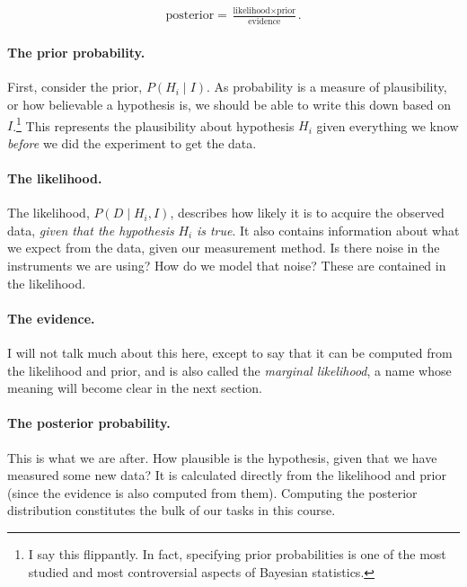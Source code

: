 \begin{align}
\text{posterior} = \frac{\text{likelihood} \times \text{prior}}{\text{evidence}}.
\end{align}

\paragraph{The prior probability.}  First, consider the prior,
$P(H_i \mid I)$.  As probability is a measure of plausibility, or how
believable a hypothesis is, we should be able to write this down based
on $I$.\footnote{I say this flippantly.  In fact, specifying prior
  probabilities is one of the most studied and most controversial
  aspects of Bayesian statistics.}  This represents the
plausibility about hypothesis $H_i$ given everything we know
\textit{before} we did the experiment to get the data.

\paragraph{The likelihood.}
The likelihood, $P(D\mid H_i,I)$, describes how likely it is to
acquire the observed data, \textit{given that the hypothesis} $H_i$
\textit{is true}.  It also contains information about what we expect
from the data, given our measurement method.  Is there noise in the
instruments we are using?  How do we model that noise?  These are
contained in the likelihood.

\paragraph{The evidence.}  I will not talk much about this here,
except to say that it can be computed from the likelihood and prior,
and is also called the \textit{marginal likelihood}, a name whose
meaning will become clear in the next section.

\paragraph{The posterior probability.} This is what we are after.  How
plausible is the hypothesis, given that we have measured some new
data?  It is calculated directly from the likelihood and prior (since
the evidence is also computed from them).  Computing the posterior
distribution constitutes the bulk of our tasks in this course.



